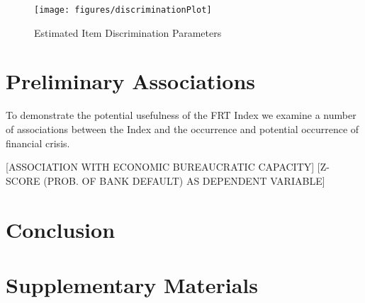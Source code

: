 \documentclass[a4paper]{article}
\begin{document}
\begin{figure}
    \caption{Estimated Item Discrimination Parameters}
    \label{DiscrimFig}
    \begin{center}
        \texttt{[image: figures/discriminationPlot]}
    \end{center}
\end{figure}


\section{Preliminary Associations}

To demonstrate the potential usefulness of the FRT Index we examine a number of associations between the Index and the occurrence and potential occurrence of financial crisis.

[ASSOCIATION WITH ECONOMIC BUREAUCRATIC CAPACITY]
[Z-SCORE (PROB. OF BANK DEFAULT) AS DEPENDENT VARIABLE]

\section*{Conclusion}




\section*{Supplementary Materials}

\end{document}
